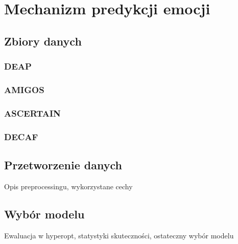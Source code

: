 \chapter{Mechanizm predykcji emocji}
\label{cha:predykcja}
\section{Zbiory danych}
\subsection{DEAP}
\subsection{AMIGOS}
\subsection{ASCERTAIN}
\subsection{DECAF}
\section{Przetworzenie danych}
Opis preprocessingu, wykorzystane cechy
\section{Wybór modelu}
Ewaluacja w hyperopt, statystyki skuteczności, ostateczny wybór modelu